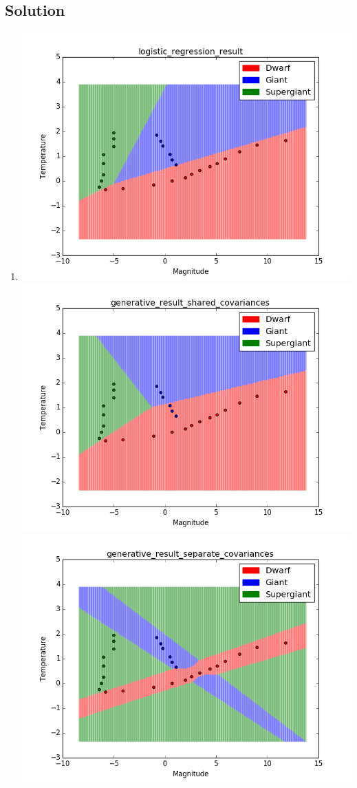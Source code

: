 \documentclass[submit]{harvardml}
\begin{document}
\subsection*{Solution}
\begin{enumerate}
    \item \hspace{2cm} \newline
    \includegraphics[scale=.40]{hw2/P3_Pics/figure_1-3.png}
    \includegraphics[scale=.40]{hw2/P3_Pics/figure_1-1.png}
    \includegraphics[scale=.40]{hw2/P3_Pics/figure_1.png}

\end{enumerate}
\end{document}
